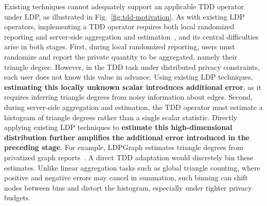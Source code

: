 Existing techniques cannot adequately support an  applicable TDD operator under LDP, as illustrated in Fig.~\ref{fig:tdd-motivation}.
As with existing LDP operators, implementing a TDD operator requires both local randomized reporting and server-side aggregation and estimation~\cite{LDPGDDWang2017,imola2021locally}, and its central difficulties arise in both stages.
First, during local randomized reporting, users must randomize and report the private quantity to be aggregated, namely their triangle degree.
However, in the TDD task under distributed privacy constraints, each user does not know this value in advance.
Using existing LDP techniques, \textbf{estimating this locally unknown scalar introduces additional error}, as it requires inferring triangle degrees from noisy information about edges.
Second, during server-side aggregation and estimation, the TDD operator must estimate a histogram of triangle degrees rather than a single scalar statistic. %
Directly applying existing LDP techniques to \textbf{estimate this high-dimensional distribution further amplifies the additional error introduced in the preceding stage}.
For example, LDPGraph estimates triangle degrees from privatized graph reports~\cite{dong2026ldpgraph}.
A direct TDD adaptation would discretely bin these estimates.
Unlike linear aggregation tasks such as global triangle counting, where positive and negative errors may cancel in summation, such binning can shift nodes between bins and distort the histogram, especially under tighter privacy budgets.

